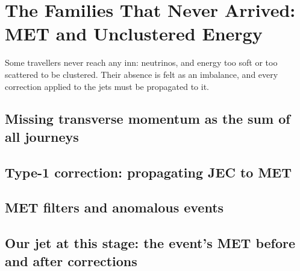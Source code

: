 \chapter{The Families That Never Arrived: MET and Unclustered Energy}
\label{ch:never_arrived}

\begin{journeybox}
Some travellers never reach any inn: neutrinos, and energy too soft or too
scattered to be clustered. Their absence is felt as an imbalance, and every
correction applied to the jets must be propagated to it.
\end{journeybox}


\section{Missing transverse momentum as the sum of all journeys}
\label{sec:never_arrived:missing_transverse_momentum_as_the_sum_o}

\section{Type-1 correction: propagating JEC to MET}
\label{sec:never_arrived:type_1_correction_propagating_jec_to_met}

\section{MET filters and anomalous events}
\label{sec:never_arrived:met_filters_and_anomalous_events}

\section{Our jet at this stage: the event's MET before and after corrections}
\label{sec:never_arrived:our_jet_at_this_stage_the_event_s_met_be}

